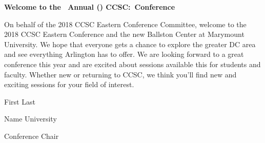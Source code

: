 \documentclass{article}
\begin{document}
\begingroup
  \centering
  \textbf{\LARGE Welcome to the \confOrdinal\ Annual (\confYear)
  CCSC:\confName\ Conference}\\
\endgroup

\vspace{10pt}

On behalf of the 2018 CCSC Eastern Conference Committee, welcome to the 2018
CCSC Eastern Conference and the new Ballston Center at Marymount University.
We hope that everyone gets a chance to explore the greater DC area and see
everything Arlington has to offer. We are looking forward to a great conference
this year and are excited about sessions available this for students and
faculty. Whether new or returning to CCSC, we think you’ll find new and
exciting sessions for your field of interest.

\vspace{10pt}

\hfill First Last

\hfill Name University

\hfill Conference Chair
\end{document}
